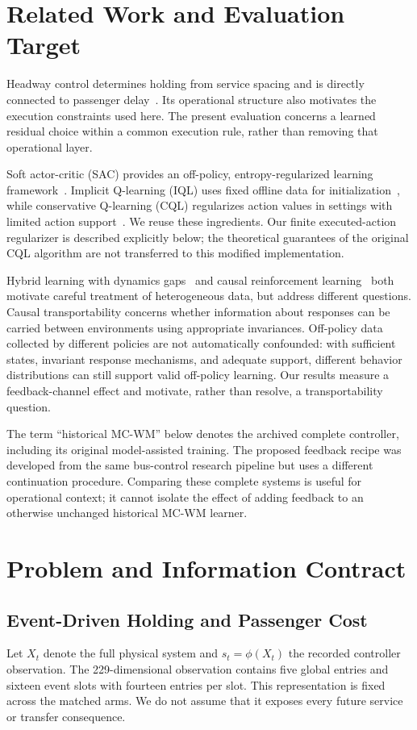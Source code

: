 \documentclass[journal]{IEEEtran}
\begin{document}
\section{Related Work and Evaluation Target}
Headway control determines holding from service spacing and is directly connected to passenger delay~\cite{daganzo2009}. Its operational structure also motivates the execution constraints used here. The present evaluation concerns a learned residual choice within a common execution rule, rather than removing that operational layer.

Soft actor-critic (SAC) provides an off-policy, entropy-regularized learning framework~\cite{sac2018}. Implicit Q-learning (IQL) uses fixed offline data for initialization~\cite{iql2022}, while conservative Q-learning (CQL) regularizes action values in settings with limited action support~\cite{cql2020}. We reuse these ingredients. Our finite executed-action regularizer is described explicitly below; the theoretical guarantees of the original CQL algorithm are not transferred to this modified implementation.

Hybrid learning with dynamics gaps~\cite{h2oplus} and causal reinforcement learning~\cite{bareinboim2020} both motivate careful treatment of heterogeneous data, but address different questions. Causal transportability concerns whether information about responses can be carried between environments using appropriate invariances. Off-policy data collected by different policies are not automatically confounded: with sufficient states, invariant response mechanisms, and adequate support, different behavior distributions can still support valid off-policy learning. Our results measure a feedback-channel effect and motivate, rather than resolve, a transportability question.

The term ``historical MC-WM'' below denotes the archived complete controller, including its original model-assisted training. The proposed feedback recipe was developed from the same bus-control research pipeline but uses a different continuation procedure. Comparing these complete systems is useful for operational context; it cannot isolate the effect of adding feedback to an otherwise unchanged historical MC-WM learner.

\section{Problem and Information Contract}
\subsection{Event-Driven Holding and Passenger Cost}
Let $X_t$ denote the full physical system and $s_t=\phi(X_t)$ the recorded controller observation. The 229-dimensional observation contains five global entries and sixteen event slots with fourteen entries per slot. This representation is fixed across the matched arms. We do not assume that it exposes every future service or transfer consequence.
\end{document}
